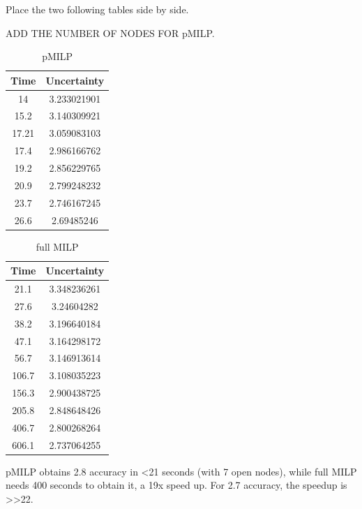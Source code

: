 Place the two following tables side by side.


ADD THE NUMBER OF NODES FOR pMILP.




\begin{table}[h!]
	\centering
	\begin{tabular}{|c|c|}
	\hline
		Time & Uncertainty\\ 
	\hline	14 & 3.233021901\\
\hline	15.2 & 3.140309921\\
\hline	17.21 & 3.059083103\\
\hline	17.4 & 2.986166762\\
\hline	19.2 & 2.856229765\\
\hline	20.9 & 2.799248232\\
\hline	23.7 & 2.746167245\\
\hline	26.6 & 2.69485246\\	
	\hline
	
	
	\end{tabular}
	\caption{pMILP}
	\label{table12}
	\end{table}
	

	
	\begin{table}[h!]
		\centering
		\begin{tabular}{|c|c|}
			\hline
			Time & Uncertainty\\ 
			\hline	21.1 & 3.348236261\\
			\hline	27.6 & 3.24604282\\
			\hline	38.2 & 3.196640184\\
			\hline	47.1 & 3.164298172\\
			\hline	56.7 & 3.146913614\\
			\hline	106.7 & 3.108035223\\
			\hline	156.3 & 2.900438725\\
			\hline	205.8 & 2.848648426\\	
			\hline	406.7 & 2.800268264 \\	
			\hline	606.1 & 2.737064255\\	
			\hline
			
			
		\end{tabular}
		\caption{full MILP}
		\label{table13}
	\end{table}
	

pMILP obtains 2.8 accuracy in <21 seconds (with 7 open nodes), while full MILP needs 400 seconds to obtain it, a 19x speed up. For 2.7 accuracy, the speedup is >>22.

